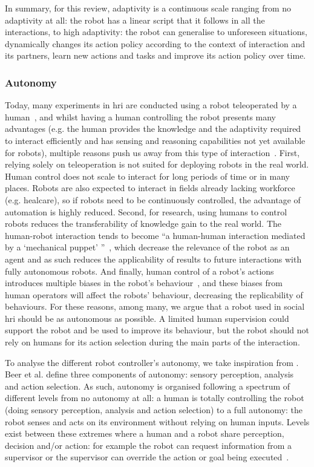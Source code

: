     In summary, for this review, adaptivity is a continuous scale ranging from no adaptivity at all: the robot has a linear script that it follows in all the interactions, to high adaptivity: the robot can generalise to unforeseen situations, dynamically changes its action policy according to the context of interaction and its partners, learn new actions and tasks and improve its action policy over time. 

\subsubsection{Autonomy}
	Today, many experiments in \gls{hri} are conducted using a robot teleoperated by a human~\citep{riek2012wizard,baxter2016characterising}, and whilst having a human controlling the robot presents many advantages (e.g. the human provides the knowledge and the adaptivity required to interact efficiently and has sensing and reasoning capabilities not yet available for robots), multiple reasons push us away from this type of interaction~\citep{thill2012robot}. First, relying solely on teleoperation is not suited for deploying robots in the real world. Human control does not scale to interact for long periods of time or in many places. Robots are also expected to interact in fields already lacking workforce (e.g. healcare), so if robots need to be continuously controlled, the advantage of automation is highly reduced. Second, for research, using humans to control robots reduces the transferability of knowledge gain to the real world. The human-robot interaction tends to become ``a human-human interaction mediated by a `mechanical puppet' ''~\citep{baxter2016characterising}, which decrease the relevance of the robot as an agent and as such reduces the applicability of results to future interactions with fully autonomous robots. And finally, human control of a robot's actions introduces multiple biases in the robot's behaviour~\citep{howley2014effects}, and these biases from human operators will affect the robots' behaviour, decreasing the replicability of behaviours. For these reasons, among many, we argue that a robot used in social \gls{hri} should be as autonomous as possible. A limited human supervision could support the robot and be used to improve its behaviour, but the robot should not rely on humans for its action selection during the main parts of the interaction. 
		
    To analyse the different robot controller's autonomy, we take inspiration from \citet{beer2014toward}. Beer et al. define three components of autonomy: sensory perception, analysis and action selection. As such, autonomy is organised following a spectrum of different levels from no autonomy at all: a human is totally controlling the robot (doing sensory perception, analysis and action selection) to a full autonomy: the robot senses and acts on its environment without relying on human inputs. Levels exist between these extremes where a human and a robot share perception, decision and/or action: for example the robot can request information from a supervisor or the supervisor can override the action or goal being executed~\citep{sheridan1978human}.
    
